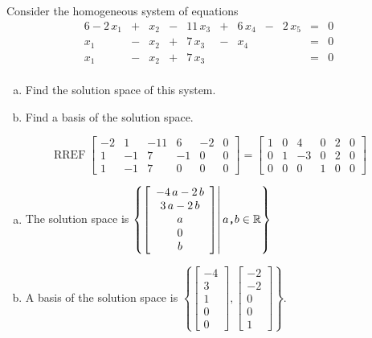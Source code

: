 
\begin{exerciseStatement}


Consider the homogeneous system of equations 
\begin{alignat*}{6} -2 \, x_{1} &+& x_{2} &-& 11 \, x_{3} &+& 6 \, x_{4} &-& 2 \, x_{5} &=& 0 \\x_{1} &-& x_{2} &+& 7 \, x_{3} &-& x_{4} & &  &=& 0 \\x_{1} &-& x_{2} &+& 7 \, x_{3} & &  & &  &=& 0 \\ \end{alignat*}
            


\begin{enumerate}[(a)]
\item  Find the solution space of this system.
\item  Find a basis of the solution space.
\end{enumerate}
    
\end{exerciseStatement}
    
\begin{exerciseAnswer} 


\[\operatorname{RREF} \left[\begin{array}{ccccc|c}
-2 & 1 & -11 & 6 & -2 & 0 \\
1 & -1 & 7 & -1 & 0 & 0 \\
1 & -1 & 7 & 0 & 0 & 0
\end{array}\right] = \left[\begin{array}{ccccc|c}
1 & 0 & 4 & 0 & 2 & 0 \\
0 & 1 & -3 & 0 & 2 & 0 \\
0 & 0 & 0 & 1 & 0 & 0
\end{array}\right] \]


\begin{enumerate}[(a)]
\item The solution space is \( \left\{ \left[\begin{array}{c}
-4 \, a - 2 \, b \\
3 \, a - 2 \, b \\
a \\
0 \\
b
\end{array}\right] \middle|\,a\text{\texttt{,}}b\in\mathbb{R}\right\} \)
\item A basis of the solution space is \( \left\{ \left[\begin{array}{c}
-4 \\
3 \\
1 \\
0 \\
0
\end{array}\right] , \left[\begin{array}{c}
-2 \\
-2 \\
0 \\
0 \\
1
\end{array}\right] \right\} \).
\end{enumerate}
    
\end{exerciseAnswer}
    
